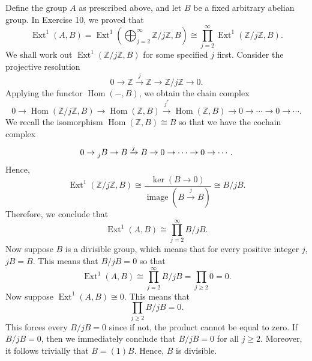 \documentclass{article}
\begin{document}
	Define the group $A$ as prescribed above, and let $B$ be a fixed arbitrary abelian group. In Exercise 10, we proved that 
	\begin{equation*}
		\operatorname{Ext}^{1}(A, B) = \operatorname{Ext}^{1}\left(\bigoplus_{j = 2}^{\infty}\mathbb{Z}/j\mathbb{Z}, B\right) \cong \prod_{j = 2}^{\infty}\operatorname{Ext}^{1}(\mathbb{Z}/j\mathbb{Z}, B). 
	\end{equation*}
	We shall work out $\operatorname{Ext}^{1}(\mathbb{Z}/j\mathbb{Z}, B)$ for some specified $j$ first. Consider the projective resolution 
	\begin{equation*}
		0 \to \mathbb{Z} \xrightarrow{j} \mathbb{Z} \to \mathbb{Z}/j\mathbb{Z} \to 0. 
	\end{equation*}
	Applying the functor $\operatorname{Hom}(-,B)$, we obtain the chain complex 
	\begin{equation*}
		0 \to \operatorname{Hom}(\mathbb{Z}/j\mathbb{Z}, B) \to \operatorname{Hom}(\mathbb{Z}, B) \xrightarrow{j^{\ast}}\operatorname{Hom}(\mathbb{Z}, B) \to 0 \to \dotsm \to 0 \to \dotsm. 
	\end{equation*}
	We recall the isomorphism $\operatorname{Hom}(\mathbb{Z}, B) \cong B$ so that we have the cochain complex
	\begin{equation*}
		0 \to \prescript{}{j}{B} \to B \xrightarrow{j} B \to 0 \to \dotsm \to 0 \to \dotsm. 
	\end{equation*}
	Hence, 
	\begin{equation*}
		\operatorname{Ext}^{1}(\mathbb{Z}/j\mathbb{Z}, B) \cong \frac{\ker(B \to 0)}{\operatorname{image}(B \xrightarrow{j} B)} \cong B/jB. 
	\end{equation*}
	Therefore, we conclude that 
	\begin{equation*}
		\operatorname{Ext}^{1}(A, B) \cong \prod_{j = 2}^{\infty}B/jB. 
	\end{equation*}
	Now suppose $B$ is a divisible group, which means that for every positive integer $j$, $jB = B$. This means that $B/jB = 0$ so that 
	\begin{equation*}
		\operatorname{Ext}^{1}(A, B) \cong \prod_{j = 2}^{\infty}B/jB = \prod_{j \geq 2} 0 = 0. 
	\end{equation*}
	Now suppose $\operatorname{Ext}^{1}(A, B) \cong 0$. This means that 
	\begin{equation*}
		\prod_{j \geq 2} B/jB = 0. 
	\end{equation*}
	This forces every $B/jB = 0$ since if not, the product cannot be equal to zero. If $B/jB = 0$, then we immediately conclude that $B/jB = 0$ for all $j \geq 2$. Moreover, it follows trivially that $B = (1)B$. Hence, $B$ is divisible. 
	
\end{document}
